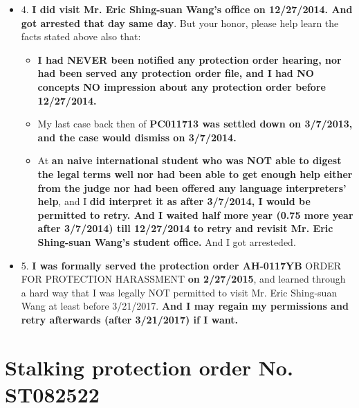 \documentclass[9pt, b5paper]{article}
\begin{document}
\begin{itemize}
\begin{itemize}
\end{itemize}
\item 4. \textbf{I did visit Mr. Eric Shing-suan Wang's office on 12/27/2014. And got arrested that day same day}. But your honor, please help learn the facts stated above also that: 
\begin{itemize}
\item \textbf{I had NEVER been notified any protection order hearing, nor had been served any protection order file, and I had NO concepts NO impression about any protection order before 12/27/2014.}
\item My last case back then of \textbf{PC011713 was settled down on 3/7/2013, and the case would dismiss on 3/7/2014.}
\item At \textbf{an naive international student who was NOT able to digest the legal terms well nor had been able to get enough help either from the judge nor had been offered any language interpreters' help}, and I \textbf{did interpret it as after 3/7/2014, I would be permitted to retry. And I waited half more year (0.75 more year after 3/7/2014) till 12/27/2014 to retry and revisit Mr. Eric Shing-suan Wang's student office.} And I got arresteded.
\end{itemize}
\item 5. \textbf{I was formally served the protection order AH-0117YB} ORDER FOR PROTECTION HARASSMENT \textbf{on 2/27/2015}, and learned through a hard way that I was legally NOT permitted to visit Mr. Eric Shing-suan Wang at least before 3/21/2017. \textbf{And I may regain my permissions and retry afterwards (after 3/21/2017) if I want.}
\end{itemize}

\section{Stalking protection order No. ST082522}
\label{sec-6}
\end{document}
